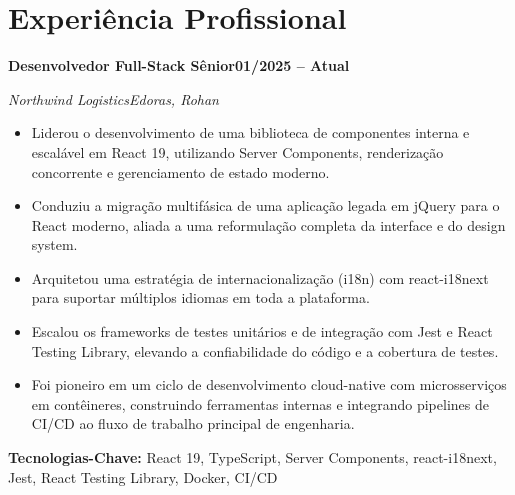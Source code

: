 \documentclass[letterpaper,11pt]{article}
\newlength{\cventrysep}\setlength{\cventrysep}{6pt}  %
\newcommand{\cvsection}[1]{\section{#1}}
\newcommand{\cventry}[4]{%
  \noindent\normalsize\textbf{#1}\hfill\small\textbf{#4}\par
  \nopagebreak[4]
  \noindent\normalsize\textit{\textcolor{accent}{#2}}\hfill\small\textit{#3}\par
  \nopagebreak[4]
}
\newcommand{\keytech}[1]{\small\textbf{Tecnologias-Chave:} #1\par}
\begin{document}
\vspace{\cventrysep}

\cvsection{Experiência Profissional}

\cventry{Desenvolvedor Full-Stack Sênior}{Northwind Logistics}{Edoras, Rohan}{01/2025 -- Atual}
\begin{itemize}\small
    \item Liderou o desenvolvimento de uma biblioteca de componentes interna e escalável em React 19, utilizando Server Components, renderização concorrente e gerenciamento de estado moderno.
    \item Conduziu a migração multifásica de uma aplicação legada em jQuery para o React moderno, aliada a uma reformulação completa da interface e do design system.
    \item Arquitetou uma estratégia de internacionalização (i18n) com react-i18next para suportar múltiplos idiomas em toda a plataforma.
    \item Escalou os frameworks de testes unitários e de integração com Jest e React Testing Library, elevando a confiabilidade do código e a cobertura de testes.
    \item Foi pioneiro em um ciclo de desenvolvimento cloud-native com microsserviços em contêineres, construindo ferramentas internas e integrando pipelines de CI/CD ao fluxo de trabalho principal de engenharia.
\end{itemize}
\keytech{React 19, TypeScript, Server Components, react-i18next, Jest, React Testing Library, Docker, CI/CD}

\vspace{\cventrysep}
\end{document}
